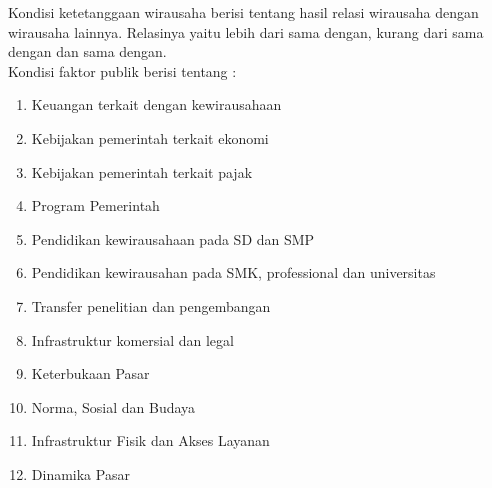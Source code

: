 Kondisi ketetanggaan wirausaha berisi tentang hasil relasi  wirausaha dengan wirausaha lainnya. Relasinya yaitu lebih dari sama dengan, kurang dari sama dengan dan sama dengan.\\
Kondisi faktor publik berisi tentang :
\begin{enumerate}
			\item Keuangan terkait dengan kewirausahaan
			\item Kebijakan pemerintah terkait ekonomi
			\item Kebijakan pemerintah terkait pajak
			\item Program Pemerintah
			\item Pendidikan kewirausahaan pada SD dan SMP
			\item Pendidikan kewirausahan pada SMK, professional dan universitas
			\item Transfer penelitian dan pengembangan
			\item Infrastruktur komersial dan legal
			\item Keterbukaan Pasar
			\item Norma, Sosial dan Budaya
			\item Infrastruktur Fisik dan Akses Layanan
			\item Dinamika Pasar
		 \end{enumerate}
		
